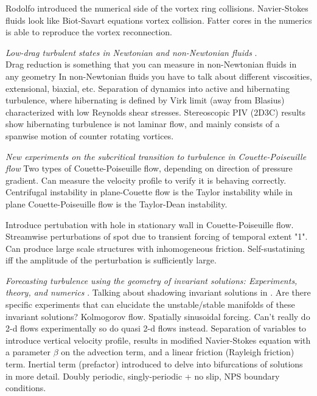 \begin{description}
{\begin{description}
Rodolfo introduced the numerical side of the vortex ring collisions.
Navier-Stokes fluids look like Biot-Savart equations vortex collision. Fatter cores
in the numerics is able to reproduce the vortex reconnection.

\item[R. Poole Talk]
\textit{Low-drag turbulent states in Newtonian and non-Newtonian fluids}
. \\
Drag reduction is something that you can measure in non-Newtonian fluids in any geometry
In non-Newtonian fluids you have to talk about different viscosities, extensional, biaxial, etc.
Separation of dynamics into active and hibernating turbulence,
where hibernating is defined by Virk limit (away from Blasius) characterized
with low Reynolds shear stresses. Stereoscopic PIV (2D3C) results show hibernating turbulence is not
laminar flow, and mainly consists of a spanwise motion of counter rotating
vortices.

\item[E. Wesfreid Talk]
\textit{New experiments on the subcritical transition to turbulence in Couette-Poiseuille flow}
Two types of Couette-Poiseuille flow, depending on direction of pressure gradient.
Can measure the velocity profile to verify it is behaving correctly.
Centrifugal instability in plane-Couette flow is the Taylor instability while in plane Couette-Poiseuille flow
is the Taylor-Dean instability.

Introduce pertubation with hole in stationary wall in Couette-Poiseuille flow. Streamwise
perturbations of spot due to transient forcing of temporal extent "1". Can produce large scale
structures with inhomogeneous friction. Self-sustatining iff the amplitude of the perturbation
is sufficiently large.

\item[M. Schatz]
\textit{Forecasting turbulence using the geometry of invariant solutions: Experiments, theory, and numerics}
.
Talking about shadowing invariant solutions in {\statesp}.
Are there specific experiments that can elucidate the unstable/stable manifolds
of these invariant solutions?
Kolmogorov flow. Spatially sinusoidal forcing.
Can't really do 2-d flows experimentally so do quasi 2-d flows instead.
Separation of variables to introduce vertical velocity profile, results in modified Navier-Stokes
equation with a parameter $\beta$ on the advection term, and a linear friction (Rayleigh friction) term.
Inertial term (prefactor) introduced to delve into bifurcations of solutions in more
detail. Doubly periodic, singly-periodic + no slip, NPS boundary conditions.


\end{description}}
\end{description}
